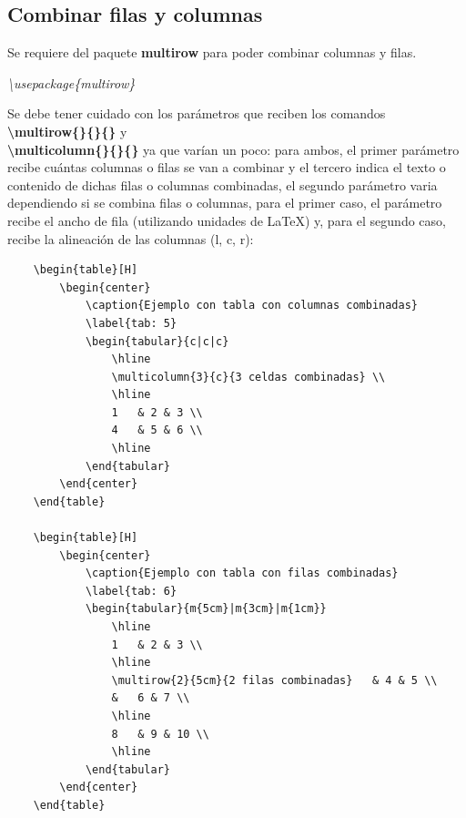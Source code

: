 \subsection{Combinar filas y columnas}
\hspace{0.55cm}Se requiere del paquete \textbf{multirow} para poder combinar columnas y filas.
\begin{center}
    \textit{\textbackslash{usepackage\{multirow\}}}
\end{center}

Se debe tener cuidado con los parámetros que reciben los comandos \textbf{\textbackslash{multirow\{\}\{\}\{\}}} y \\ \textbf{\textbackslash{multicolumn\{\}\{\}\{\}}} ya que varían un poco: para ambos, el primer parámetro recibe cuántas columnas o filas se van a combinar y el tercero indica el texto o contenido de dichas filas o columnas combinadas, el segundo parámetro varia dependiendo si se combina filas o columnas, para el primer caso, el parámetro recibe el ancho de fila (utilizando unidades de \LaTeX) y, para el segundo caso, recibe la alineación de las columnas (l, c, r):
\begin{lstlisting}
    \begin{table}[H]
        \begin{center}
            \caption{Ejemplo con tabla con columnas combinadas}
            \label{tab: 5}
            \begin{tabular}{c|c|c}
                \hline
                \multicolumn{3}{c}{3 celdas combinadas} \\
                \hline
                1   & 2 & 3 \\
                4   & 5 & 6 \\
                \hline
            \end{tabular}
        \end{center}
    \end{table}
    
    \begin{table}[H]
        \begin{center}
            \caption{Ejemplo con tabla con filas combinadas}
            \label{tab: 6}
            \begin{tabular}{m{5cm}|m{3cm}|m{1cm}}
                \hline
                1   & 2 & 3 \\
                \hline
                \multirow{2}{5cm}{2 filas combinadas}   & 4 & 5 \\
                &   6 & 7 \\
                \hline
                8   & 9 & 10 \\
                \hline
            \end{tabular}
        \end{center}
    \end{table}
\end{lstlisting}

